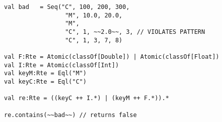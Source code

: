 \begin{lstlisting}[style=reclojureScala]
val bad   = Seq("C", 100, 200, 300,
                 "M", 10.0, 20.0,
                 "M",
                 "C", 1, ~~2.0~~, 3, // VIOLATES PATTERN
                 "C", 1, 3, 7, 8)

val F:Rte = Atomic(classOf[Double]) | Atomic(classOf[Float])
val I:Rte = Atomic(classOf[Int])
val keyM:Rte = Eql("M")
val keyC:Rte = Eql("C")

val re:Rte = ((keyC ++ I.*) | (keyM ++ F.*)).*

re.contains(~~bad~~) // returns false
\end{lstlisting}
